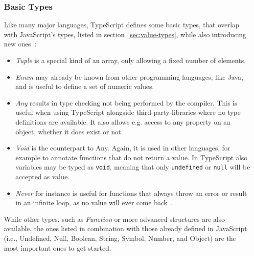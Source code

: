 
\subsubsection{Basic Types}
\label{sec:ts-basic-types}

Like many major languages, TypeScript defines some basic types, that overlap with JavaScript's types, listed in section~\ref{sec:value-types}, while also introducing new ones~\cite{TypeScriptHandbook:BasicTypes}:
\begin{itemize}
  \item \emph{Tuple} is a special kind of an array, only allowing a fixed number of elements.
  \item \emph{Enum} may already be known from other programming languages, like Java, and is useful to define a set of numeric values.
  \item \emph{Any} results in type checking not being performed by the compiler. This is useful when using TypeScript alongside third-party-libraries where no type definitions are available. It also allows e.g. access to any property on an object, whether it does exist or not.
  \item \emph{Void} is the counterpart to Any. Again, it is used in other languages, for example to annotate functions that do not return a value. In TypeScript also variables may be typed as \texttt{void}, meaning that only \texttt{undefined} or \texttt{null} will be accepted as value.
  \item \emph{Never} for instance is useful for functions that always throw an error or result in an infinite loop, as no value will ever come back~\cite{TypeScriptHandbook:BasicTypes}.
\end{itemize}
While other types, such as \emph{Function} or more advanced structures are also available, the ones listed in combination with those already defined in JavaScript (i.e., Undefined, Null, Boolean, String, Symbol, Number, and Object) are the most important ones to get started.


